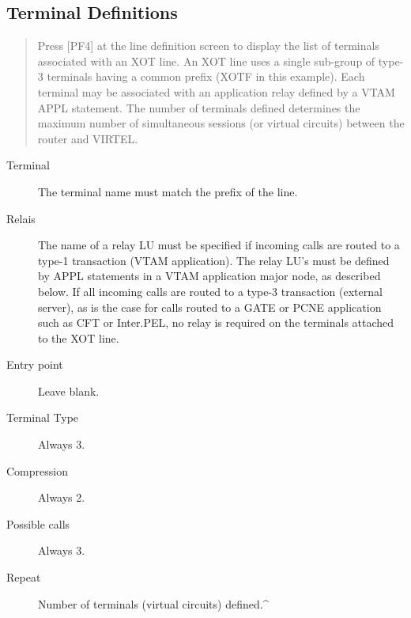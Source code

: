 \documentclass[letterpaper,10pt,english]{sphinxmanual}
\begin{document}
\subsection{Terminal Definitions}
\label{\detokenize{connectivity_guide:index-53}}\label{\detokenize{connectivity_guide:id23}}\begin{quote}

Press {[}PF4{]} at the line definition screen to display the list of terminals associated with an XOT line. An XOT line uses a single sub-group of type-3 terminals having a common prefix (XOTF in this example). Each terminal may be associated with an application relay defined by a VTAM APPL statement. The number of terminals defined determines the maximum number of simultaneous sessions (or virtual circuits) between the router and VIRTEL.
\end{quote}


\begin{description}
\item[{Terminal}] \leavevmode
The terminal name must match the prefix of the line.

\item[{Relais}] \leavevmode
The name of a relay LU must be specified if incoming calls are
routed to a type-1 transaction (VTAM application). The relay LU’s
must be defined by APPL statements in a VTAM application major node,
as described below. If all incoming calls are routed to a type-3
transaction (external server), as is the case for calls routed to a
GATE or PCNE application such as CFT or Inter.PEL, no relay is
required on the terminals attached to the XOT line.

\item[{Entry point}] \leavevmode
Leave blank.

\item[{Terminal Type}] \leavevmode
Always 3.

\item[{Compression}] \leavevmode
Always 2.

\item[{Possible calls}] \leavevmode
Always 3.

\item[{Repeat}] \leavevmode
Number of terminals (virtual circuits) defined.\textasciicircum{}

\end{description}
\end{document}
